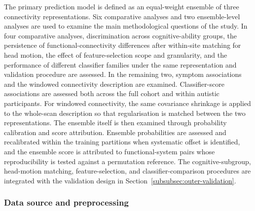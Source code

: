 The primary prediction model is defined as an equal-weight ensemble of three connectivity representations. Six comparative analyses and two ensemble-level analyses are used to examine the main methodological questions of the study. In four comparative analyses, discrimination across cognitive-ability groups, the persistence of functional-connectivity differences after within-site matching for head motion, the effect of feature-selection scope and granularity, and the performance of different classifier families under the same representation and validation procedure are assessed. In the remaining two, symptom associations and the windowed connectivity description are examined. Classifier-score associations are assessed both across the full cohort and within autistic participants. For windowed connectivity, the same covariance shrinkage is applied to the whole-scan description so that regularisation is matched between the two representations. The ensemble itself is then examined through probability calibration and score attribution. Ensemble probabilities are assessed and recalibrated within the training partitions when systematic offset is identified, and the ensemble score is attributed to functional-system pairs whose reproducibility is tested against a permutation reference. The cognitive-subgroup, head-motion matching, feature-selection, and classifier-comparison procedures are integrated with the validation design in Section~\ref{subsubsec:outer-validation}.


\subsubsection{Data source and preprocessing}
\label{subsubsec:data-preprocessing}

